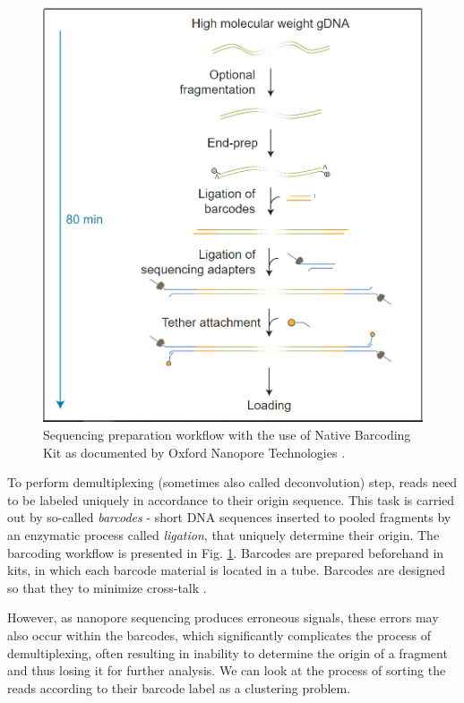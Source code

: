 \begin{figure}[!ht]
    \centering
    \includegraphics[scale=0.7]{images/barcoding.png}
    \caption[Sequencing preparation workflow.]{Sequencing preparation workflow with the use of Native Barcoding Kit as documented by Oxford Nanopore Technologies \cite{BarcodesONT}.}
    \label{fig:barcodes_workflow}
\end{figure}

To perform demultiplexing (sometimes also called deconvolution) step, reads need to be labeled uniquely in accordance to their origin sequence. This task is carried out by so-called \textit{barcodes} - short DNA sequences inserted to pooled fragments by an enzymatic process called \textit{ligation}, that uniquely determine their origin. The barcoding workflow is presented in Fig. \ref{fig:barcodes_workflow}.  Barcodes are prepared beforehand in kits, in which each barcode material is located in a tube. Barcodes are designed so that they to minimize cross-talk \cite{BarcodesONT}.

However, as nanopore sequencing produces erroneous signals, these errors may also occur within the barcodes, which significantly complicates the process of demultiplexing, often resulting in inability to determine the origin of a fragment and thus losing it for further analysis. We can look at the process of sorting the reads according to their barcode label as a clustering problem.


